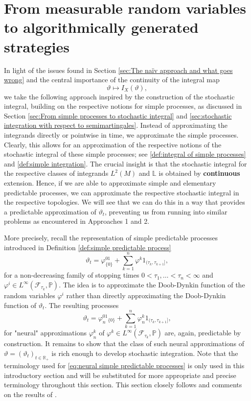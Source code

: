 \documentclass[11pt,a4paper,twoside,openany]{report}
\numberwithin{equation}{section}
\theoremstyle{plain} %
\theoremstyle{definition} %
\theoremstyle{remark} %
\let\parencite\authnumparencite
\begin{document}
\section{From measurable random variables to algorithmically generated strategies}\label{sec:main ideas of alexandar}
 In light of the issues found in Section \ref{sec:The naïv approach and what goes wrong} and the central importance of the continuity of the integral map 
 \begin{equation*}
     \vartheta\mapsto I_X(\vartheta),
 \end{equation*}
 we take the following approach inspired by the construction of the stochastic integral, building on the respective notions for simple processes, as discussed in Section \ref{sec:From simple processes to stochastic integral} and \ref{sec:stochastic integration with respect to semimartingales}. Instead of approximating the integrands directly or pointwise in time, we approximate the simple processes. Clearly, this allows for an approximation of the respective notions of the stochastic integral of these simple processes; see \ref{def:integral of simple processes} and \eqref{def:simple integration}. The crucial insight is that the stochastic integral for the respective classes of integrands \(L^2(M)\) and \(\mathbb{L}\) is obtained by \textbf{continuous} extension. Hence, if we are able to approximate simple and elementary predictable processes, we can approximate the respective stochastic integral in the respective topologies. We will see that we can do this in a way that provides a predictable approximation of \(\vartheta_t\), preventing us from running into similar problems as encountered in Approaches 1 and 2.

 
More precisely, recall the representation of simple predictable processes introduced in Definition \ref{def:simple predictable process}
 \begin{equation*}
     \vartheta_t = \varphi^01_{\{ 0\}}+\sum_{k=1}^n \varphi^k1_{(\tau_k,\tau_{k+1}]},
 \end{equation*}
 for a non-decreasing family of stopping times \(0<\tau_1,\dots<\tau_n<\infty\) and \(\varphi^i\in L^{\infty}(\mathcal{F}_{\tau_k},\mathbb{P})\). The idea is to approximate the Doob-Dynkin function of the random variables \(\varphi^i\) rather than directly approximating the Doob-Dynkin function of \(\vartheta_t\). The resulting processes
 \begin{equation}\label{eq:neural simple predictable processes}
     \vartheta_t = \varphi_n^01_{\{ 0\}}+\sum_{k=1}^n \varphi_n^k1_{(\tau_k,\tau_{k+1}]},
 \end{equation}
 for "neural" approximations \(\varphi_n^k\) of \(\varphi^k\in L^{\infty}(\mathcal{F}_{\tau_k},\mathbb{P})\) are, again, predictable by construction. It remains to show that the class of such neural approximations of \(\vartheta=(\vartheta_t)_{t\in\mathbb{R}_+}\) is rich enough to develop stochastic integration.
 Note that the terminology used for \eqref{eq:neural simple predictable processes} is only used in this introductory section and will be substituted for more appropriate and precise terminology throughout this section. This section closely follows and comments on the results of \parencite[Chapter.~5]{Arandjelovic2025}.
\end{document}
